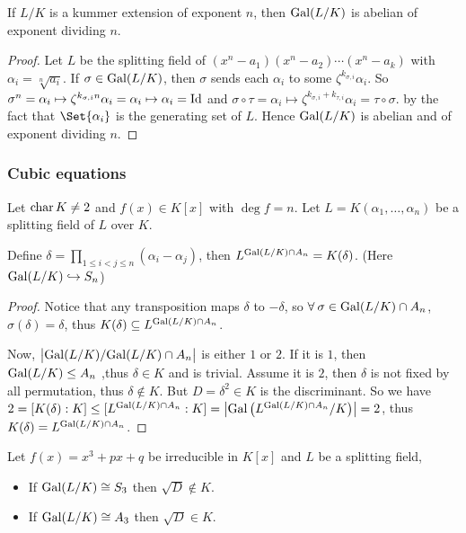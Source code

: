 \begin{theorem}
  If $L/K$ is a kummer extension of exponent $n$, then $\Gal(L/K)$ is abelian of exponent dividing $n$.

  \begin{proof}
    Let $L$ be the splitting field of $(x^n - a_1)(x^n - a_2) \dotsm (x^n - a_k)$ with $\alpha_i = \sqrt[n]{a_i}$.
    If $\sigma \in \Gal(L/K)$, then $\sigma$ sends each $\alpha_i$ to some $\zeta^{k_{\sigma, i}} \alpha_i$.
    So $\sigma^n = \alpha_i \mapsto \zeta^{k_{\sigma, i} n} \alpha_i = \alpha_i \mapsto \alpha_i = \Id$
    and $\sigma \circ \tau = \alpha_i \mapsto \zeta^{k_{\sigma, i} + k_{\tau, i}} \alpha_i = \tau \circ \sigma$.
    by the fact that  $\Set{\alpha_i}$ is the generating set of $L$. Hence $\Gal(L/K)$ is abelian and of
    exponent dividing $n$.
  \end{proof}
\end{theorem}

\subsubsection{Cubic equations}

\begin{lemma}
  Let $\Char K \neq 2$ and $f(x) \in K[x]$ with $\deg f = n$. Let
  $L = K(\alpha_1, \dots, \alpha_n)$ be a splitting field of $L$ over $K$.

  Define $\delta = \prod\limits_{1 \leq i < j \leq n} (\alpha_i - \alpha_j)$, then
  $L^{\Gal(L/K) \cap A_n} = K(\delta)$.  (Here $\Gal(L/K) \toone S_n$)

  \begin{proof}
    Notice that any transposition maps $\delta$ to $-\delta$, so
    $\forall \sigma \in \Gal(L/K) \cap A_n$, $\sigma(\delta) = \delta$, thus
    $K(\delta) \subseteq L^{\Gal(L/K) \cap A_n}$.

    Now, $\big| \quot{\Gal(L/K)}{\Gal(L/K) \cap A_n} \big|$ is either $1$ or $2$.
    If it is $1$, then $\Gal(L/K) \leq A_n$ ,thus $\delta \in K$ and is trivial.
    Assume it is $2$, then $\delta$ is not fixed by all permutation, thus
    $\delta \notin K$. But $D = \delta^2 \in K$ is the discriminant. So we have
    $2 = [K(\delta): K] \le [L^{\Gal(L/K) \cap A_n}: K] =
    \abs*{\Gal \big( L^{\Gal(L/K) \cap A_n}/K \big)} = 2$, thus
    $K(\delta) = L^{\Gal(L/K) \cap A_n}$.
  \end{proof}
\end{lemma}

\begin{prop}
  Let $f(x) = x^3 + px + q$ be irreducible in $K[x]$ and $L$ be a splitting field,
  \begin{itemize}
    \item If $\Gal(L/K) \cong S_3$ then $\sqrt{D} \notin K$.
    \item If $\Gal(L/K) \cong A_3$ then $\sqrt{D} \in K$.
  \end{itemize}
\end{prop}

